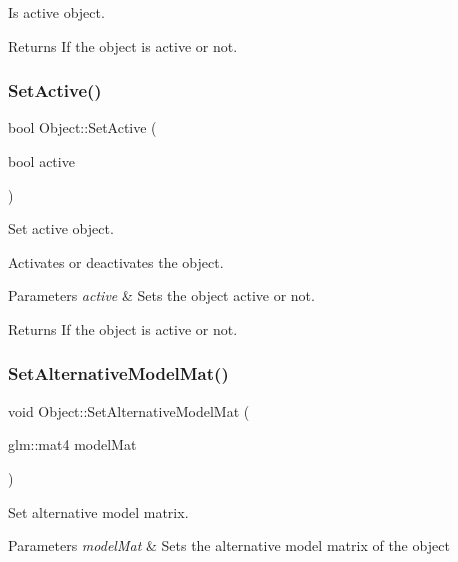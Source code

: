 Is active object. 

\begin{DoxyReturn}{Returns}
If the object is active or not. 
\end{DoxyReturn}
\mbox{\label{class_object_ab1946453ecbf12a897ba6a363704cd86}} 
\subsubsection{\texorpdfstring{Set\+Active()}{SetActive()}}
{\footnotesize\ttfamily bool Object\+::\+Set\+Active (\begin{DoxyParamCaption}\item[{bool}]{active }\end{DoxyParamCaption})}



Set active object. 

Activates or deactivates the object. 
\begin{DoxyParams}{Parameters}
{\em active} & Sets the object active or not. \\
\hline
\end{DoxyParams}
\begin{DoxyReturn}{Returns}
If the object is active or not. 
\end{DoxyReturn}
\mbox{\label{class_object_a178b374670d4681c61556a352276f96a}} 
\subsubsection{\texorpdfstring{Set\+Alternative\+Model\+Mat()}{SetAlternativeModelMat()}}
{\footnotesize\ttfamily void Object\+::\+Set\+Alternative\+Model\+Mat (\begin{DoxyParamCaption}\item[{glm\+::mat4}]{model\+Mat }\end{DoxyParamCaption})}



Set alternative model matrix. 


\begin{DoxyParams}{Parameters}
{\em model\+Mat} & Sets the alternative model matrix of the object \\
\hline
\end{DoxyParams}
\mbox{\label{class_object_a0aaf9cce0a37d5bb0af6eb11ab8dce64}} 
